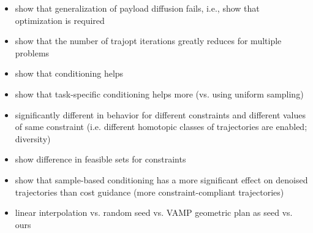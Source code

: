 


 




\begin{itemize}
    \item show that generalization of payload diffusion fails, i.e., show that optimization is required
    \item show that the number of trajopt iterations greatly reduces for multiple problems
    \item show that conditioning helps
    \item show that task-specific conditioning helps more (vs. using uniform sampling)
    \item significantly different in behavior for different constraints and different values of same constraint (i.e. different homotopic classes of trajectories are enabled; diversity)
    \item show difference in feasible sets for constraints
    \item show that sample-based conditioning has a more significant effect on denoised trajectories than cost guidance (more constraint-compliant trajectories)
    \item linear interpolation vs. random seed vs. VAMP geometric plan as seed vs. ours
\end{itemize}




